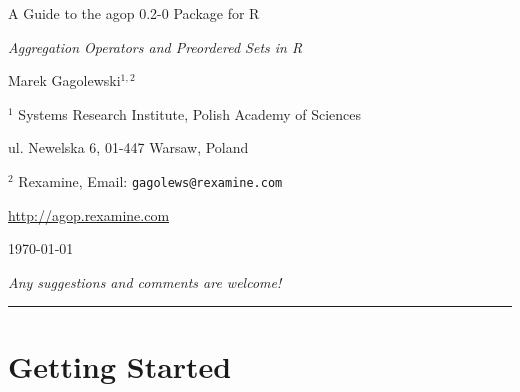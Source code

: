 \documentclass[11pt]{article}\usepackage[]{graphicx}\usepackage[]{color}
\newcommand{\package}[1]{\textsf{#1}\xspace}
\newcommand{\lang}[1]{\textsf{#1}\xspace}
\newcommand{\R}{\lang{R}}
\theoremstyle{remark}
\theoremstyle{definition}
\begin{document}
\begin{center}
{\LARGE\sf A Guide to the \package{agop} {0.2-0} Package for \R}

{\large\sf\textit{Aggregation Operators and Preordered Sets in \R}}

\bigskip
{\large Marek Gagolewski${}^{1,2}$}

${}^{1}$ Systems Research Institute, Polish Academy of Sciences

ul. Newelska 6, 01-447 Warsaw, Poland

${}^{2}$ Rexamine, Email: \texttt{gagolews@rexamine.com}

\href{http://agop.rexamine.com/}%
{http://agop.rexamine.com}

\bigskip
\today


\medskip
\textit{Any suggestions and comments are welcome!}
\end{center}





\bigskip\hrule\bigskip
\tableofcontents








\section{Getting Started}
\end{document}

